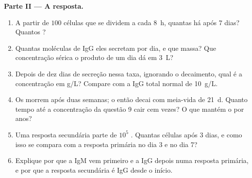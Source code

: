 \begin{problem}
\medskip
\noindent\textbf{Parte II --- A resposta.}
\begin{enumerate}[resume]
  \item A partir de $100$ células que se dividem a cada \qty{8}{h},
        quantas há após $7$ dias? Quantos ?
  \item Quantas moléculas de IgG eles secretam por dia, e que massa?
        Que concentração sérica o produto de um dia dá em \qty{3}{L}?
  \item Depois de dez dias de secreção nessa taxa, ignorando o
        decaimento, qual é a concentração em g/L? Compare com a IgG
        total normal de \qty{10}{g/L}.
  \item Os  morrem após duas semanas; o  então decai
        com meia-vida de \qty{21}{d}. Quanto tempo até a concentração da
        questão 9 cair cem vezes? O que mantém o  por anos?
  \item Uma resposta secundária parte de $10^{5}$ .
        Quantas células após $3$ dias, e como isso se compara com a
        resposta primária no dia 3 e no dia 7?
  \item Explique por que a IgM vem primeiro e a IgG depois numa resposta
        primária, e por que a resposta secundária é IgG desde o início.
\end{enumerate}


\end{problem}

